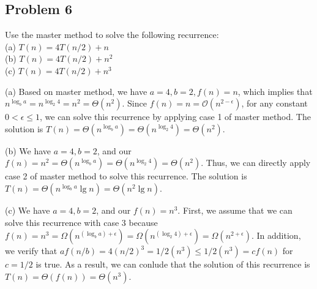 \documentclass[a4paper]{article}
\makeatletter
\newenvironment{solution}
  {\begin{proof}[Solution]}
  {\end{proof}}
\renewenvironment{proof}[1][\proofname]{%
  \par\pushQED{\qed}\normalfont%
  \topsep6\p@\@plus6\p@\relax
  \trivlist\item[\hskip\labelsep\bfseries#1\@addpunct{.}]%
  \ignorespaces
}{%
  \popQED\endtrivlist\@endpefalse
}
\makeatother
\begin{document}
\subsection*{Problem 6}
Use the master method to solve the following recurrence: \\
(a) $T(n)=4T(n/2)+n$ \\
(b) $T(n)=4T(n/2)+n^2$ \\
(c) $T(n)=4T(n/2)+n^3$
\begin{solution}
  (a) Based on master method, we have $a = 4, b = 2, f(n) = n$, which implies that $n^{\log_{b}a} = n^{\log_{2}4} = n^2 = \Theta(n^2)$. Since $f(n) = n = \mathcal{O}(n^{2-\epsilon})$, for any constant $0 < \epsilon \le 1$, we can solve this recurrence by applying case 1 of master method. The solution is $T(n) = \Theta(n^{\log_{b}a}) = \Theta(n^{\log_{2}4}) = \Theta(n^2)$.
\end{solution}

\begin{solution}
  (b) We have $a = 4, b = 2$, and our $f(n) = n^2 = \Theta(n^{\log_{b}a}) = \Theta(n^{\log_{2}4}) = \Theta(n^2)$. Thus, we can directly apply case 2 of master method to solve this recurrence. The solution is $T(n) = \Theta(n^{\log_{b}a}\lg n) = \Theta(n^2\lg n)$.
\end{solution}

\begin{solution}
  (c) We have $a = 4, b = 2$, and our $f(n) = n^3$. First, we assume that we can solve this recurrence with case 3 because $f(n) = n^3 = \Omega(n^{(\log_{b}a) + \epsilon}) = \Omega(n^{(\log_{2}4) + \epsilon}) = \Omega(n^{2 + \epsilon})$. In addition, we verify that $af(n/b) = 4(n/2)^3 = 1/2(n^3) \le 1/2(n^3) = cf(n)$ for $c = 1/2$ is true. As a result, we can conlude that the solution of this recurrence is $T(n) = \Theta(f(n)) = \Theta(n^3)$.
\end{solution}
\end{document}
